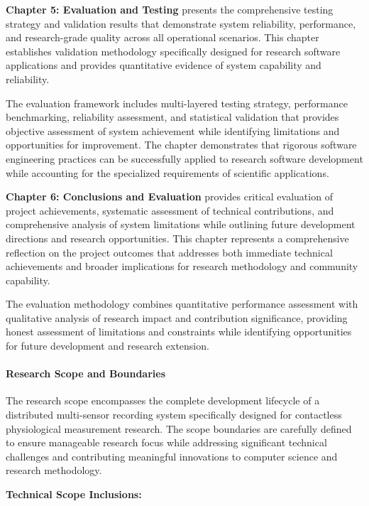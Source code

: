 \documentclass[12pt,a4paper]{report}
\begin{document}
\textbf{Chapter 5: Evaluation and Testing} presents the comprehensive testing strategy and validation results that
demonstrate system reliability, performance, and research-grade quality across all operational scenarios. This chapter
establishes validation methodology specifically designed for research software applications and provides quantitative
evidence of system capability and reliability.

The evaluation framework includes multi-layered testing strategy, performance benchmarking, reliability assessment, and
statistical validation that provides objective assessment of system achievement while identifying limitations and
opportunities for improvement. The chapter demonstrates that rigorous software engineering practices can be successfully
applied to research software development while accounting for the specialized requirements of scientific applications.

\textbf{Chapter 6: Conclusions and Evaluation} provides critical evaluation of project achievements, systematic assessment of
technical contributions, and comprehensive analysis of system limitations while outlining future development directions
and research opportunities. This chapter represents a comprehensive reflection on the project outcomes that addresses
both immediate technical achievements and broader implications for research methodology and community capability.

The evaluation methodology combines quantitative performance assessment with qualitative analysis of research impact and
contribution significance, providing honest assessment of limitations and constraints while identifying opportunities
for future development and research extension.

\paragraph{Research Scope and Boundaries}

The research scope encompasses the complete development lifecycle of a distributed multi-sensor recording system
specifically designed for contactless physiological measurement research. The scope boundaries are carefully defined to
ensure manageable research focus while addressing significant technical challenges and contributing meaningful
innovations to computer science and research methodology.

\textbf{Technical Scope Inclusions:}
\end{document}
